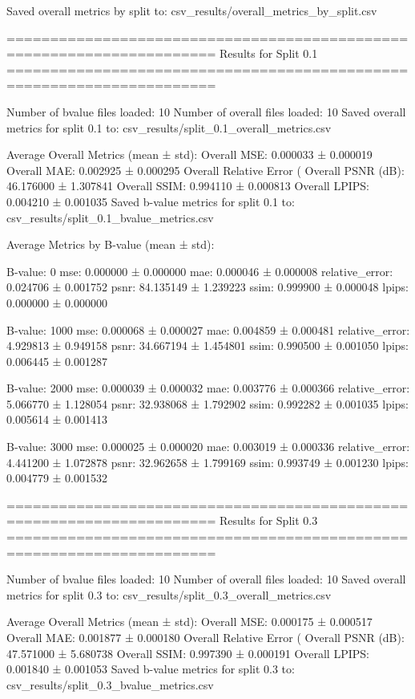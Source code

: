 Saved overall metrics by split to: csv_results/overall_metrics_by_split.csv

======================================================================
Results for Split 0.1
======================================================================

Number of bvalue files loaded: 10
Number of overall files loaded: 10
Saved overall metrics for split 0.1 to: csv_results/split_0.1_overall_metrics.csv

Average Overall Metrics (mean ± std):
Overall MSE: 0.000033 ± 0.000019
Overall MAE: 0.002925 ± 0.000295
Overall Relative Error (%
Overall PSNR (dB): 46.176000 ± 1.307841
Overall SSIM: 0.994110 ± 0.000813
Overall LPIPS: 0.004210 ± 0.001035
Saved b-value metrics for split 0.1 to: csv_results/split_0.1_bvalue_metrics.csv

Average Metrics by B-value (mean ± std):

B-value: 0
mse: 0.000000 ± 0.000000
mae: 0.000046 ± 0.000008
relative_error: 0.024706 ± 0.001752
psnr: 84.135149 ± 1.239223
ssim: 0.999900 ± 0.000048
lpips: 0.000000 ± 0.000000

B-value: 1000
mse: 0.000068 ± 0.000027
mae: 0.004859 ± 0.000481
relative_error: 4.929813 ± 0.949158
psnr: 34.667194 ± 1.454801
ssim: 0.990500 ± 0.001050
lpips: 0.006445 ± 0.001287

B-value: 2000
mse: 0.000039 ± 0.000032
mae: 0.003776 ± 0.000366
relative_error: 5.066770 ± 1.128054
psnr: 32.938068 ± 1.792902
ssim: 0.992282 ± 0.001035
lpips: 0.005614 ± 0.001413

B-value: 3000
mse: 0.000025 ± 0.000020
mae: 0.003019 ± 0.000336
relative_error: 4.441200 ± 1.072878
psnr: 32.962658 ± 1.799169
ssim: 0.993749 ± 0.001230
lpips: 0.004779 ± 0.001532

======================================================================
Results for Split 0.3
======================================================================

Number of bvalue files loaded: 10
Number of overall files loaded: 10
Saved overall metrics for split 0.3 to: csv_results/split_0.3_overall_metrics.csv

Average Overall Metrics (mean ± std):
Overall MSE: 0.000175 ± 0.000517
Overall MAE: 0.001877 ± 0.000180
Overall Relative Error (%
Overall PSNR (dB): 47.571000 ± 5.680738
Overall SSIM: 0.997390 ± 0.000191
Overall LPIPS: 0.001840 ± 0.001053
Saved b-value metrics for split 0.3 to: csv_results/split_0.3_bvalue_metrics.csv


